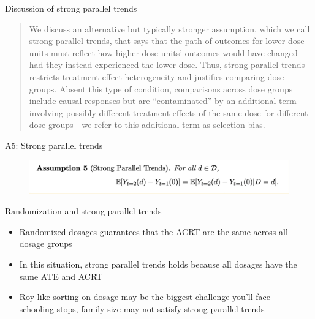 \documentclass{beamer}
\begin{document}
\begin{frame}{Discussion of strong parallel trends}

\begin{quote}
We discuss an alternative but typically stronger assumption, which we call strong parallel trends, that says that the path of outcomes for lower-dose units must reflect how higher-dose units’ outcomes would have changed had they instead experienced the lower dose. Thus, strong parallel trends restricts treatment effect heterogeneity and justifies comparing dose groups. Absent this type of condition, comparisons across dose groups include causal responses but are “contaminated” by an additional term involving possibly different treatment effects of the same dose for different dose groups—we refer to this additional term as selection bias.
\end{quote}

\end{frame}

\begin{frame}{A5: Strong parallel trends}

\begin{figure}
\begin{center}
             \includegraphics[scale=0.45]{./lecture_includes/continuous7.png}
\end{center}
\end{figure}

\end{frame}


\begin{frame}{Randomization and strong parallel trends}

\begin{itemize}

\item Randomized dosages guarantees that the ACRT are the same across all dosage groups
\item In this situation, strong parallel trends holds because all dosages have the same ATE and ACRT
\item Roy like sorting on dosage may be the biggest challenge you'll face -- schooling stops, family size may not satisfy strong parallel trends

\end{itemize}

\end{frame}
\end{document}
